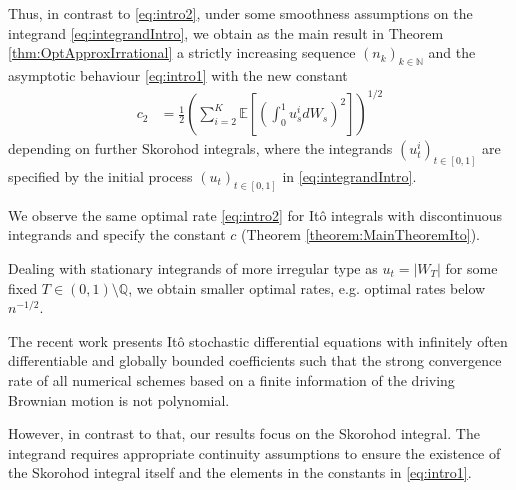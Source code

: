 \documentclass[a4paper,11pt,reqno]{amsart}
\theoremstyle{plain}
\def\N{\mathbb{N}}
\def\Q{\mathbb{Q}}
\def\P{\mathcal{P}}
\def\ex{\mathbb{E}}
\def\ve{\varepsilon}
\numberwithin{equation}{section}
\begin{document}
Thus, in contrast to \eqref{eq:intro2}, under some smoothness assumptions on the integrand \eqref{eq:integrandIntro}, we obtain as the main result in Theorem \ref{thm:OptApproxIrrational} a strictly increasing sequence $(n_k)_{k \in \N}$ and the asymptotic behaviour \eqref{eq:intro1} with the new constant
\begin{align*}
c_2 &= \frac{1}{2}  \left(\sum_{i=2}^{K}\ex\left[\left(\int_{0}^{1}u^i_s dW_s\right)^2\right]\right)^{1/2}
\end{align*}
depending on further Skorohod integrals, where the integrands $(u^i_t)_{t \in [0,1]}$ are specified by the initial process $(u_t)_{t\in [0,1]}$ in \eqref{eq:integrandIntro}. 

We observe the same optimal rate \eqref{eq:intro2} for It\^o integrals with discontinuous integrands and specify the constant $c$ (Theorem \ref{theorem:MainTheoremIto}). 

Dealing with stationary integrands of more irregular type as $u_t =|W_T|$ for some fixed $T \in (0,1) \setminus \Q$, we obtain smaller optimal rates, e.g. optimal rates below $n^{-1/2}$.

The recent work \cite{Jentzen_MG_Y} presents It\^o stochastic differential equations with infinitely often differentiable and globally bounded coefficients such that the strong convergence rate of all numerical schemes based on a finite information of the driving Brownian motion is not polynomial.


However, in contrast to that, our results focus on the Skorohod integral. The integrand requires appropriate continuity assumptions to ensure the existence of the Skorohod integral itself and the elements in the constants in \eqref{eq:intro1}.
\end{document}
